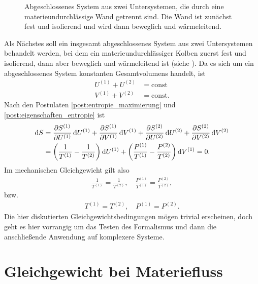 \begin{figure}[htbp]
    \centering
    \tfigDoppelsystemUVNbeweglicheWaermeleitendeWand
    \caption{Abgeschlossenes System aus zwei Untersystemen, die durch eine materieundurchlässige Wand getrennt sind. Die Wand ist zunächst fest und isolierend und wird dann beweglich und wärmeleitend.}
    \label{fig:DoppelsystemUVNbeweglicheWaermeleitendeWand}
\end{figure}


Als Nächstes soll ein insgesamt abgeschlossenes System aus zwei Untersystemen behandelt werden, bei dem ein materieundurchlässiger Kolben zuerst fest und isolierend, dann aber beweglich und wärmeleitend ist (siehe ). Da es sich um ein abgeschlossenes System konstanten Gesamtvolumens handelt, ist
\begin{align*}
    U^{(1)} + U^{(2)} & = \mathrm{const}  \\
    V^{(1)} + V^{(2)} & = \mathrm{const}.
\end{align*}
Nach den Postulaten \ref{post:entropie_maximierung} und \ref{post:eigenschaften_entropie} ist
\begin{align*}
    \mathop{}\!\mathrm{d} S & = \frac{\partial S^{(1)}}{\partial U^{(1)}}\mathop{}\!\mathrm{d} U^{(1)} + \frac{\partial S^{(1)}}{\partial V^{(1)}}\mathop{}\!\mathrm{d} V^{(1)}+\frac{\partial S^{(2)}}{\partial U^{(2)}}\mathop{}\!\mathrm{d} U^{(2)} + \frac{\partial S^{(2)}}{\partial V^{(2)}}\mathop{}\!\mathrm{d} V^{(2)} \\
            & = \left(\frac{1}{T^{(1)}}-\frac{1}{T^{(2)}}\right)\mathop{}\!\mathrm{d} U^{(1)} + \left(\frac{P^{(1)}}{T^{(1)}}-\frac{P^{(2)}}{T^{(2)}}\right) \mathop{}\!\mathrm{d} V^{(1)} = 0.
\end{align*}
Im mechanischen Gleichgewicht gilt also
\begin{align*}
    \frac{1}{T^{(1)}} = \frac{1}{T^{(2)}} , \quad \frac{P^{(1)}}{T^{(1)}}=\frac{P^{(2)}}{T^{(2)}},
\end{align*}
bzw.
\begin{align*}
    T^{(1)} = T^{(2)}, \quad P^{(1)} = P^{(2)}.
\end{align*}
Die hier diskutierten Gleichgewichtsbedingungen mögen trivial erscheinen, doch geht es hier vorrangig um das Testen des Formalismus und dann die anschließende Anwendung auf komplexere Systeme.


\section{Gleichgewicht bei Materiefluss\label{sec:gleichgewicht_bei_materiefluss}}

